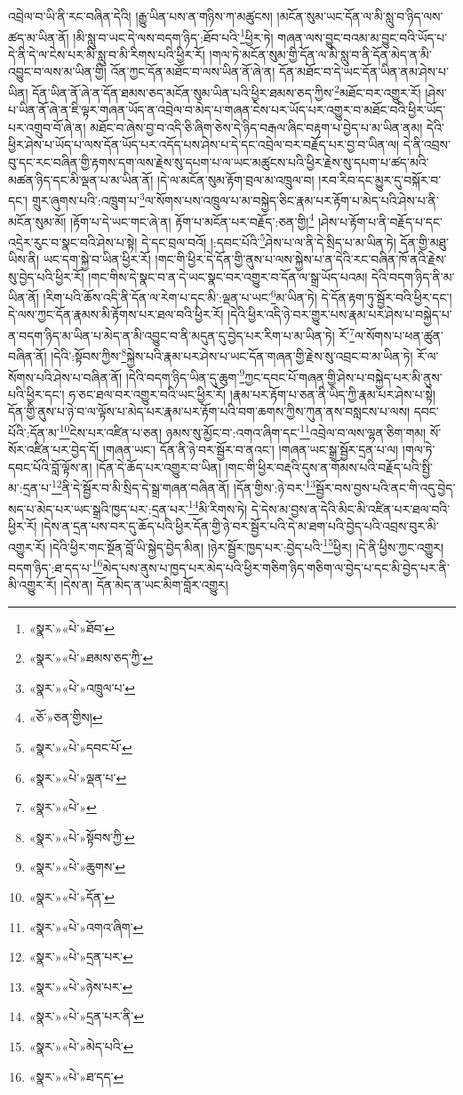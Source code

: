 འབྲེལ་བ་ཡི་ནི་རང་བཞིན་དེའི། །རྒྱུ་ཡིན་པས་ན་གཉིས་ཀ་མཚུངས། །མངོན་སུམ་ཡང་དོན་ལ་མི་སླུ་བ་ཉིད་ལས་ཚད་མ་ཡིན་ནོ། །མི་སླུ་བ་ཡང་དེ་ལས་བདག་ཉིད་:ཐོབ་པའི་\footnote{«སྣར་»«པེ་»ཐོབ་}ཕྱིར་ཏེ། གཞན་ལས་བྱུང་བའམ་མ་བྱུང་བའི་ཡོད་པ་དེ་ནི་དེ་ལ་ངེས་པར་མི་སླུ་བ་མི་རིགས་པའི་ཕྱིར་རོ། །གལ་ཏེ་མངོན་སུམ་གྱི་དོན་ལ་མི་སླུ་བ་ནི་དོན་མེད་ན་མི་འབྱུང་བ་ལས་མ་ཡིན་གྱི། འོན་ཀྱང་དོན་མཐོང་བ་ལས་ཡིན་ནོ་ཞེ་ན། དོན་མཐོང་བ་དེ་ཡང་དོན་ཡིན་ནམ་ཤེས་པ་ཡིན། དོན་ཡིན་ནོ་ཞེ་ན་དོན་ཐམས་ཅད་མངོན་སུམ་ཡིན་པའི་ཕྱིར་ཐམས་ཅད་ཀྱིས་\footnote{«སྣར་»«པེ་»ཐམས་ཅད་ཀྱི་}མཐོང་བར་འགྱུར་རོ། །ཤེས་པ་ཡིན་ནོ་ཞེ་ན་ཇི་ལྟར་གཞན་ཡོད་ན་འབྲེལ་བ་མེད་པ་གཞན་ངེས་པར་ཡོད་པར་འགྱུར་བ་མཐོང་བའི་ཕྱིར་ཡོད་པར་འགྲུབ་བོ་ཞེ་ན། མཐོང་བ་ཞེས་བྱ་བ་འདི་ཅི་ཞིག་ཅེས་དེ་ཉིད་བརྒལ་ཞིང་བརྟག་པ་བྱེད་པ་མ་ཡིན་ནམ། དེའི་ཕྱིར་ཤེས་པ་ཡོད་པ་ལས་དོན་ཡོད་པར་འདོད་པས་ཤེས་པ་དེ་དང་འབྲེལ་བར་བརྗོད་པར་བྱ་བ་ཡིན་ལ། དེ་ནི་འབྲས་བུ་དང་རང་བཞིན་གྱི་རྟགས་དག་ལས་རྗེས་སུ་དཔག་པ་ལ་ཡང་མཚུངས་པའི་ཕྱིར་རྗེས་སུ་དཔག་པ་ཚད་མའི་མཚན་ཉིད་དང་མི་ལྡན་པ་མ་ཡིན་ནོ། །དེ་ལ་མངོན་སུམ་རྟོག་བྲལ་མ་འཁྲུལ་བ། །རབ་རིབ་དང་མྱུར་དུ་བསྐོར་བ་དང་། གྲུར་ཞུགས་པའི་:འཁྲུག་པ་\footnote{«སྣར་»«པེ་»འཁྲུལ་པ་}ལ་སོགས་པས་འཁྲུལ་པ་མ་བསྐྱེད་ཅིང་རྣམ་པར་རྟོག་པ་མེད་པའི་ཤེས་པ་ནི་མངོན་སུམ་མོ། །རྟོག་པ་དེ་ཡང་གང་ཞེ་ན། རྟོག་པ་མངོན་པར་བརྗོད་:ཅན་གྱི།\footnote{«ཅོ་»ཅན་གྱིས།} །ཤེས་པ་རྟོག་པ་ནི་བརྗོད་པ་དང་འདྲེར་རུང་བ་སྣང་བའི་ཤེས་པ་སྟེ། དེ་དང་བྲལ་བའོ། །:དབང་པོའི་\footnote{«སྣར་»«པེ་»དབང་པོ་}ཤེས་པ་ལ་ནི་དེ་སྲིད་པ་མ་ཡིན་ཏེ། དོན་གྱི་མཐུ་ཡིས་ནི། ཡང་དག་སྐྱེ་བ་ཡིན་ཕྱིར་རོ། །གང་གི་ཕྱིར་དེ་དོན་གྱི་ནུས་པ་ལས་སྐྱེས་པ་ན་དེའི་རང་བཞིན་ཁོ་ནའི་རྗེས་སུ་བྱེད་པའི་ཕྱིར་རོ། །གང་གིས་དེ་སྣང་བ་ན་དེ་ཡང་སྣང་བར་འགྱུར་བ་དོན་ལ་སྒྲ་ཡོད་པའམ། དེའི་བདག་ཉིད་ནི་མ་ཡིན་ནོ། །རིག་པའི་ཆོས་འདི་ནི་དོན་ལ་རེག་པ་དང་མི་:ལྡན་པ་ཡང་\footnote{«སྣར་»«པེ་»ལྡན་པ་}མ་ཡིན་ཏེ། དེ་དོན་རྟག་ཏུ་སྦྱོར་བའི་ཕྱིར་དང་། དེ་ལས་ཀྱང་དོན་རྣམས་མི་རྟོགས་པར་ཐལ་བའི་ཕྱིར་རོ། །དེའི་ཕྱིར་འདི་ཉེ་བར་གྱུར་པས་རྣམ་པར་ཤེས་པ་བསྐྱེད་པ་ན་བདག་ཉིད་མ་ཡིན་པ་མེད་ན་མི་འབྱུང་བ་ནི་མདུན་དུ་བྱེད་པར་རིག་པ་མ་ཡིན་ཏེ། རོ་\footnote{«སྣར་»«པེ་»}ལ་སོགས་པ་ཕན་ཚུན་བཞིན་ནོ། །དེའི་:སྟོབས་ཀྱིས་\footnote{«སྣར་»«པེ་»སྟོབས་ཀྱི་}སྐྱེས་པའི་རྣམ་པར་ཤེས་པ་ཡང་དོན་གཞན་གྱི་རྗེས་སུ་འབྲང་བ་མ་ཡིན་ཏེ། རོ་ལ་སོགས་པའི་ཤེས་པ་བཞིན་ནོ། །དེའི་བདག་ཉིད་ཡིན་དུ་ཆུག་\footnote{«སྣར་»«པེ་»ཆུགས་}ཀྱང་དབང་པོ་གཞན་གྱི་ཤེས་པ་བསྐྱེད་པར་མི་ནུས་པའི་ཕྱིར་དང་། ཧ་ཅང་ཐལ་བར་འགྱུར་བའི་ཡང་ཕྱིར་རོ། །རྣམ་པར་རྟོག་པ་ཅན་ནི་ཡིད་ཀྱི་རྣམ་པར་ཤེས་པ་སྟེ། དོན་གྱི་ནུས་པ་ཉེ་བ་ལ་ལྟོས་པ་མེད་པར་རྣམ་པར་རྟོག་པའི་བག་ཆགས་ཀྱིས་ཀུན་ནས་བསླངས་པ་ལས། དབང་པོའི་:དོན་མ་\footnote{«སྣར་»«པེ་»དོན་}ངེས་པར་འཛིན་པ་ཅན། ཉམས་སུ་མྱོང་བ་:འགའ་ཞིག་དང་\footnote{«སྣར་»«པེ་»འགའ་ཞིག་}འབྲེལ་བ་ལས་ལྷན་ཅིག་གམ། སོ་སོར་འཛིན་པར་བྱེད་དོ། །གཞན་ཡང་། དོན་ནི་ཉེ་བར་སྦྱོར་བ་ནའང་། །གཞན་ཡང་སྒྲ་སྦྱོར་དྲན་པ་ལ། །གལ་ཏེ་དབང་པོའི་བློ་ལྟོས་ན། །དོན་དེ་ཆོད་པར་འགྱུར་བ་ཡིན། །གང་གི་ཕྱིར་བརྡའི་དུས་ན་གོམས་པའི་བརྗོད་པའི་སྤྱི་མ་:དྲན་པ་\footnote{«སྣར་»«པེ་»དྲན་པར་}ནི་དེ་སྦྱོར་བ་མི་སྲིད་དེ་སྒྲ་གཞན་བཞིན་ནོ། །དོན་གྱིས་:ཉེ་བར་\footnote{«སྣར་»«པེ་»ཉེས་པར་}སྦྱོར་བས་བྱས་པའི་ནང་གི་འདུ་བྱེད་སད་པ་མེད་པར་ཡང་སྒྲའི་ཁྱད་པར་:དྲན་པར་\footnote{«སྣར་»«པེ་»དྲན་པར་ནི་}མི་རིགས་ཏེ། དེ་དེས་མ་བྱས་ན་དེའི་མིང་མི་འཛིན་པར་ཐལ་བའི་ཕྱིར་རོ། །དེས་ན་དྲན་པས་བར་དུ་ཆོད་པའི་ཕྱིར་དོན་གྱི་ཉེ་བར་སྦྱོར་པའི་དེ་མ་ཐག་པའི་བྱེད་པའི་འབྲས་བུར་མི་འགྱུར་རོ། །དེའི་ཕྱིར་གང་སྔོན་བློ་ཡི་སྐྱེད་བྱེད་མིན། །ཉེར་སྦྱོར་ཁྱད་པར་:བྱེད་པའི་\footnote{«སྣར་»«པེ་»མེད་པའི་}ཕྱིར། །དེ་ནི་ཕྱིས་ཀྱང་འགྱུར། བདག་ཉིད་:ཐ་དད་པ་\footnote{«སྣར་»«པེ་»ཐ་དད་}མེད་པས་ནུས་པ་ཁྱད་པར་མེད་པའི་ཕྱིར་གཅིག་ཉིད་གཅིག་ལ་བྱེད་པ་དང་མི་བྱེད་པར་ནི་མི་འགྱུར་རོ། །དེས་ན། དོན་མེད་ན་ཡང་མིག་བློར་འགྱུར། 